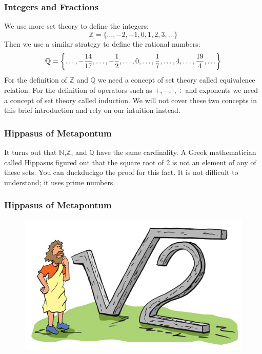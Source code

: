 \documentclass[xcolor=dvipsnames]{beamer}
\begin{document}
\begin{frame}
  \frametitle{Integers and Fractions}
  We use more set theory to define the integers:
  \begin{equation}
    \label{eq:eofiebee}
    \mathbb{Z}=\{\ldots,-2,-1,0,1,2,3,\ldots\}
  \end{equation}
  Then we use a similar strategy to define the rational numbers:
  \begin{equation}
    \label{eq:ciuceeke}
    \mathbb{Q}=\left\{\ldots,-\frac{14}{17},\ldots,-\frac{1}{2},\ldots,0,\ldots,\frac{1}{7},\ldots,4,\ldots,\frac{19}{4},\ldots\right\}\notag
  \end{equation}
  For the definition of $\mathbb{Z}$ and $\mathbb{Q}$ we need a
  concept of set theory called \alert{equivalence relation}. For the
  definition of operators such as $+,-,\cdot,\div$ and exponents we
  need a concept of set theory called \alert{induction}. We will not
  cover these two concepts in this brief introduction and rely on our
  intuition instead.
\end{frame}

\begin{frame}
  \frametitle{Hippasus of Metapontum}
It turns out that $\mathbb{N}$,$\mathbb{Z}$, and $\mathbb{Q}$ have the
same cardinality. A Greek mathematician called Hippasus
figured out that the square root of 2 is not an element of any of
these sets. You can duckduckgo the proof for this fact. It is not
difficult to understand; it uses prime numbers.
\end{frame}

\begin{frame}
  \frametitle{Hippasus of Metapontum}
  \begin{figure}[h]
    \includegraphics[scale=0.6]{./hippasusofmetapontum.jpg}
  \end{figure}
\end{frame}
\end{document}
